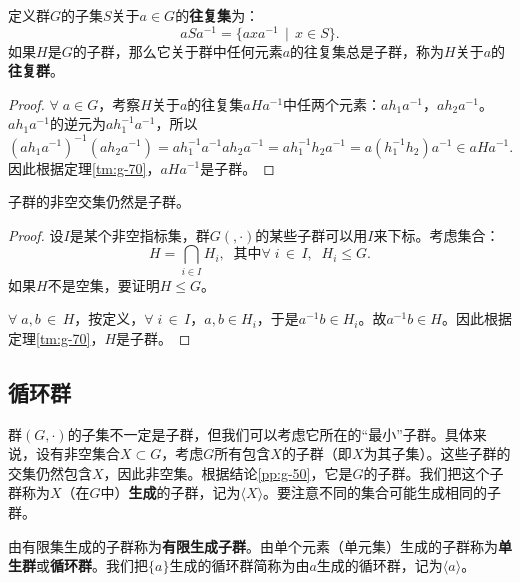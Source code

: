 \documentclass[12pt,UTF8,fontset=none]{ctexbook}
\begin{document}
\begin{tm}\label{tm:g-80}  
    定义群$G$的子集$S$关于$a\in G$的\textbf{往复集}为：
    $$ aSa^{-1} = \{axa^{-1}\,\mid\,x\in S\}.$$
    如果$H$是$G$的子群，那么它关于群中任何元素$a$的往复集总是子群，称为$H$关于$a$的\textbf{往复群}。
\end{tm}
\begin{proof}
    $\forall \; a\in G$，考察$H$关于$a$的往复集$aHa^{-1}$中任两个元素：$ah_1a^{-1}$，$ah_2a^{-1}$。$ah_1a^{-1}$的逆元为$ah_1^{-1}a^{-1}$，所以
    $$ (ah_1a^{-1})^{-1} (ah_2a^{-1}) = ah_1^{-1}a^{-1}ah_2a^{-1} = ah_1^{-1}h_2a^{-1} = a(h_1^{-1}h_2)a^{-1} \in aHa^{-1}. $$
    因此根据定理\ref{tm:g-70}，$aHa^{-1}$是子群。
\end{proof}

\begin{pp}\label{pp:g-50}
    子群的非空交集仍然是子群。
\end{pp}
\begin{proof}
    设$I$是某个非空指标集，群$G(,\cdot)$的某些子群可以用$I$来下标。考虑集合：
    $$ H = \bigcap_{i\in I}H_i, \;\;\mbox{其中} \forall\;i\,\in\, I,\;\; H_i\leq G.$$
    如果$H$不是空集，要证明$H\leq G$。

    $\forall\;a,b\,\in\,H$，按定义，$\forall\;i\,\in\, I$，$a,b\in H_i$，于是$a^{-1}b\in H_i$。故$a^{-1}b\in H$。因此根据定理\ref{tm:g-70}，$H$是子群。
\end{proof}

\subsection{循环群}

群$(G,\cdot)$的子集不一定是子群，但我们可以考虑它所在的“最小”子群。具体来说，设有非空集合$X\subset G$，考虑$G$所有包含$X$的子群（即$X$为其子集）。这些子群的交集仍然包含$X$，因此非空集。根据结论\ref{pp:g-50}，它是$G$的子群。我们把这个子群称为$X$（在$G$中）\textbf{生成}的子群，记为$\langle X\rangle$。要注意不同的集合可能生成相同的子群。

由有限集生成的子群称为\textbf{有限生成子群}。由单个元素（单元集）生成的子群称为\textbf{单生群}或\textbf{循环群}。我们把$\{a\}$生成的循环群简称为由$a$生成的循环群，记为$\langle a\rangle$。
\end{document}
